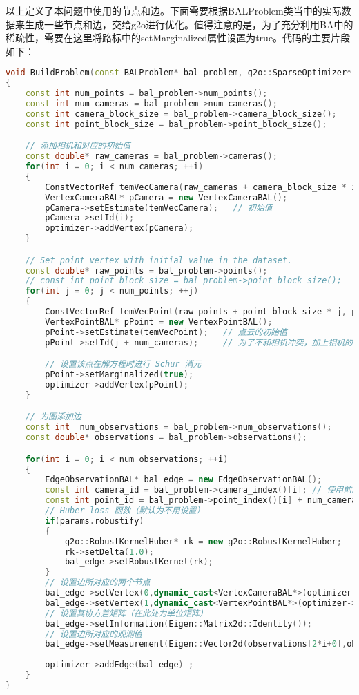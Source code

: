 以上定义了本问题中使用的节点和边。下面需要根据BALProblem类当中的实际数据来生成一些节点和边，交给g2o进行优化。值得注意的是，为了充分利用BA中的稀疏性，需要在这里将路标中的setMarginalized属性设置为true。代码的主要片段如下：

\begin{lstlisting}[language=c++,caption=slambook/ch10/g2o_custombundle/g2o_bundle.cpp（片段）]
void BuildProblem(const BALProblem* bal_problem, g2o::SparseOptimizer* optimizer, const BundleParams& params)
{
	const int num_points = bal_problem->num_points();
	const int num_cameras = bal_problem->num_cameras();
	const int camera_block_size = bal_problem->camera_block_size();
	const int point_block_size = bal_problem->point_block_size();

	// 添加相机和对应的初始值
	const double* raw_cameras = bal_problem->cameras();
	for(int i = 0; i < num_cameras; ++i)
	{
		ConstVectorRef temVecCamera(raw_cameras + camera_block_size * i,camera_block_size);
		VertexCameraBAL* pCamera = new VertexCameraBAL();
		pCamera->setEstimate(temVecCamera);   // 初始值
		pCamera->setId(i);           
		optimizer->addVertex(pCamera);
	}

	// Set point vertex with initial value in the dataset. 
	const double* raw_points = bal_problem->points();
	// const int point_block_size = bal_problem->point_block_size();
	for(int j = 0; j < num_points; ++j)
	{
		ConstVectorRef temVecPoint(raw_points + point_block_size * j, point_block_size);
		VertexPointBAL* pPoint = new VertexPointBAL();
		pPoint->setEstimate(temVecPoint);   // 点云的初始值
		pPoint->setId(j + num_cameras);     // 为了不和相机冲突，加上相机的 id

		// 设置该点在解方程时进行 Schur 消元
		pPoint->setMarginalized(true);
		optimizer->addVertex(pPoint);
	}

	// 为图添加边
	const int  num_observations = bal_problem->num_observations();
	const double* observations = bal_problem->observations();   

	for(int i = 0; i < num_observations; ++i)
	{	
		EdgeObservationBAL* bal_edge = new EdgeObservationBAL();
		const int camera_id = bal_problem->camera_index()[i]; // 使用前面的 id 获取相机
		const int point_id = bal_problem->point_index()[i] + num_cameras; // 使用前面的 id 获得点
		// Huber loss 函数（默认为不用设置）
		if(params.robustify)
		{
			g2o::RobustKernelHuber* rk = new g2o::RobustKernelHuber;
			rk->setDelta(1.0);
			bal_edge->setRobustKernel(rk);
		}
		// 设置边所对应的两个节点
		bal_edge->setVertex(0,dynamic_cast<VertexCameraBAL*>(optimizer->vertex(camera_id)));
		bal_edge->setVertex(1,dynamic_cast<VertexPointBAL*>(optimizer->vertex(point_id)));
		// 设置其协方差矩阵（在此处为单位矩阵）
		bal_edge->setInformation(Eigen::Matrix2d::Identity());
		// 设置边所对应的观测值
		bal_edge->setMeasurement(Eigen::Vector2d(observations[2*i+0],observations[2*i + 1]));
		
		optimizer->addEdge(bal_edge) ;
	}
}

\end{lstlisting}

